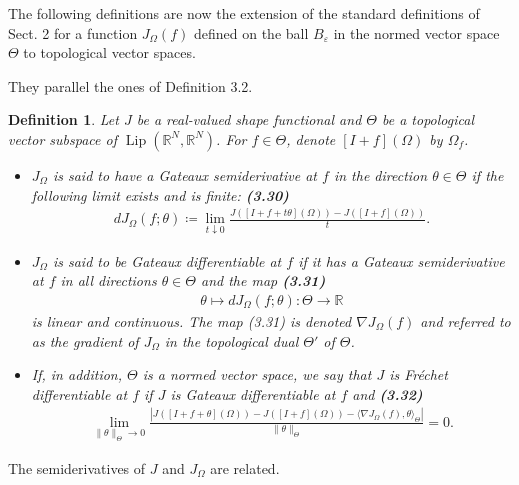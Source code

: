 \documentclass[oneside]{book}
\numberwithin{equation}{section}
\newtheorem{definition}{Definition}[section]
\begin{document}
%
The following definitions are now the extension of the standard definitions of Sect. 2 for a function $J_\Omega(f)$ defined on the ball $B_\varepsilon$ in the normed vector space $\Theta$ to topological vector spaces.

They parallel the ones of Definition 3.2.

\begin{definition}
    Let $J$ be a real-valued shape functional and $\Theta$ be a topological vector subspace of $\operatorname{Lip}(\mathbb{R}^N,\mathbb{R}^N)$. For $f\in\Theta$, denote $[I + f](\Omega)$ by $\Omega_f$.
    \begin{itemize}
        \item[(i)] $J_\Omega$ is said to have a \emph{Gateaux semiderivative} at $f$ in the direction $\theta\in\Theta$ if the following limit exists and is finite: \textbf{(3.30)}
        \begin{align*}
            dJ_\Omega(f;\theta)\coloneqq\lim_{t\downarrow 0} \frac{J\left([I + f + t\theta](\Omega)\right) - J\left([I + f](\Omega)\right)}{t}.
        \end{align*}
        \item[(ii)] $J_\Omega$ is said to be \emph{Gateaux differentiable} at $f$ if it has a \emph{Gateaux semiderivative} at $f$ in all directions $\theta\in\Theta$ and the map \textbf{(3.31)}
        \begin{align*}
            \theta\mapsto dJ_\Omega(f;\theta):\Theta\to\mathbb{R}
        \end{align*}
        is linear and continuous. The map (3.31) is denoted $\nabla J_\Omega(f)$ and referred to as the gradient of $J_\Omega$ in the topological dual $\Theta'$ of $\Theta$.
        \item[(iii)] If, in addition, $\Theta$ is a normed vector space, we say that $J$ is \emph{Fréchet differentiable} at $f$ if $J$ is Gateaux differentiable at $f$ and \textbf{(3.32)}
        \begin{align*}
            \lim_{\|\theta\|_\Theta\to 0} \frac{\left|J\left([I + f + \theta](\Omega)\right) - J\left([I + f](\Omega)\right) - \langle\nabla J_\Omega(f),\theta\rangle_\Theta\right|}{\|\theta\|_\Theta} = 0.
        \end{align*}
    \end{itemize}
\end{definition}
The semiderivatives of $J$ and $J_\Omega$ are related.
\end{document}
